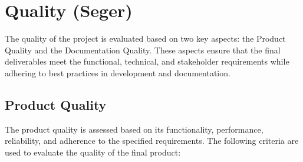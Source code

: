 \documentclass{article}
\begin{document}
\newpage

\section{Quality (Seger)}
The quality of the project is evaluated based on two key aspects: the Product Quality and the Documentation Quality. These aspects ensure that the final deliverables meet the functional, technical, and stakeholder requirements while adhering to best practices in development and documentation.

\subsection{Product Quality}
The product quality is assessed based on its functionality, performance, reliability, and adherence to the specified requirements. The following criteria are used to evaluate the quality of the final product:
\end{document}
